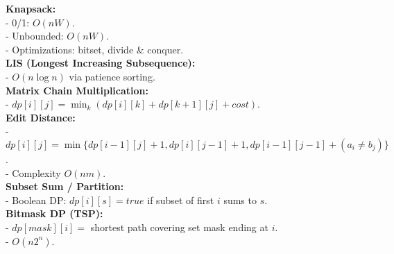 \textbf{Knapsack:} \\[1mm]
- 0/1: $O(nW)$. \\
- Unbounded: $O(nW)$. \\
- Optimizations: bitset, divide \& conquer. \\

\textbf{LIS (Longest Increasing Subsequence):} \\[1mm]
- $O(n\log n)$ via patience sorting. \\

\textbf{Matrix Chain Multiplication:} \\[1mm]
- $dp[i][j]=\min_{k}(dp[i][k]+dp[k+1][j]+cost)$. \\

\textbf{Edit Distance:} \\[1mm]
- $dp[i][j]=\min\{dp[i-1][j]+1, dp[i][j-1]+1, dp[i-1][j-1]+(a_i\ne b_j)\}$. \\
- Complexity $O(nm)$. \\

\textbf{Subset Sum / Partition:} \\[1mm]
- Boolean DP: $dp[i][s]=true$ if subset of first $i$ sums to $s$. \\

\textbf{Bitmask DP (TSP):} \\[1mm]
- $dp[mask][i]=$ shortest path covering set mask ending at $i$. \\
- $O(n2^n)$. \\